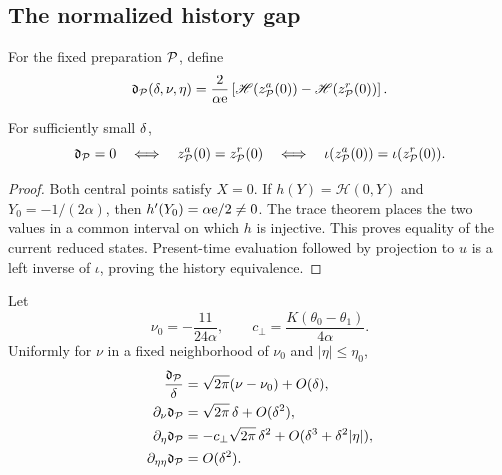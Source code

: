 \subsection{The normalized history gap}

For the fixed preparation \(\mathcal P\), define
\begin{equation}
\label{eq:canonical-gap}
 \mathfrak d_\mathcal P(\delta,\nu,\eta)
 =\frac{2}{\alpha\mathrm e}
 \left[\mathscr H(z^a_\mathcal P(0))-\mathscr H(z^r_\mathcal P(0))\right].
\end{equation}

\begin{lemma}
\label{lem:gap-history}
For sufficiently small \(\delta\),
\begin{equation}
\label{eq:gap-history-equivalence}
 \mathfrak d_\mathcal P=0
 \quad\Longleftrightarrow\quad
 z^a_\mathcal P(0)=z^r_\mathcal P(0)
 \quad\Longleftrightarrow\quad
 \iota(z^a_\mathcal P(0))=\iota(z^r_\mathcal P(0)).
\end{equation}
\end{lemma}

\begin{proof}
Both central points satisfy \(X=0\).  If
\(h(Y)=\mathscr H(0,Y)\) and \(Y_0=-1/(2\alpha)\), then
\(h'(Y_0)=\alpha\mathrm e/2\ne0\).  The trace theorem places the two values in a
common interval on which \(h\) is injective.  This proves equality of the
current reduced states.  Present-time evaluation followed by projection to
\(u\) is a left inverse of \(\iota\), proving the history equivalence.
\end{proof}

\begin{proposition}
\label{prop:gap-expansion}
Let
\begin{equation}
\label{eq:nu0}
 \nu_0=-\frac{11}{24\alpha},
 \qquad
 c_\perp=\frac{K(\theta_0-\theta_1)}{4\alpha}.
\end{equation}
Uniformly for \(\nu\) in a fixed neighborhood of \(\nu_0\) and
\(|\eta|\le\eta_0\),
\begin{equation}
\label{eq:full-gap-expansion}
\begin{aligned}
 \frac{\mathfrak d_\mathcal P}{\delta}
 &=\sqrt{2\pi}(\nu-\nu_0)+O(\delta),\\
 \partial_\nu\mathfrak d_\mathcal P
 &=\sqrt{2\pi}\,\delta+O(\delta^2),\\
 \partial_\eta\mathfrak d_\mathcal P
 &=-c_\perp\sqrt{2\pi}\,\delta^2
   +O(\delta^3+\delta^2|\eta|),\\
 \partial_{\eta\eta}\mathfrak d_\mathcal P&=O(\delta^2).
\end{aligned}
\end{equation}
\end{proposition}

